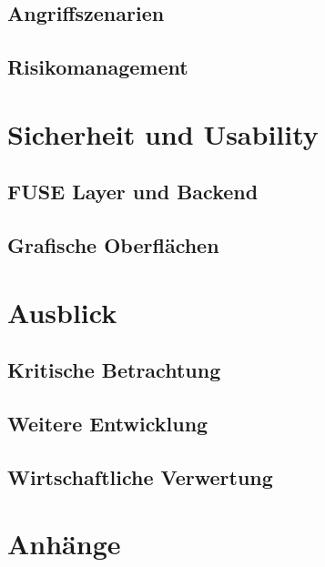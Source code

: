 \documentclass[11pt,ngerman,toc=listof,index=totoc]{scrreprt}
\begin{document}
\section{Angriffszenarien}\label{angriffszenarien}

\section{Risikomanagement}\label{risikomanagement}

\chapter{Sicherheit und Usability}\label{sicherheit-und-usability}

\section{FUSE Layer und Backend}\label{fuse-layer-und-backend}

\section{Grafische Oberflächen}\label{grafische-oberfluxe4chen}

\chapter{Ausblick}\label{ausblick}

\section{Kritische Betrachtung}\label{kritische-betrachtung}

\section{Weitere Entwicklung}\label{weitere-entwicklung}

\section{Wirtschaftliche Verwertung}\label{wirtschaftliche-verwertung}

\chapter{Anhänge}\label{anhuxe4nge}
\end{document}
